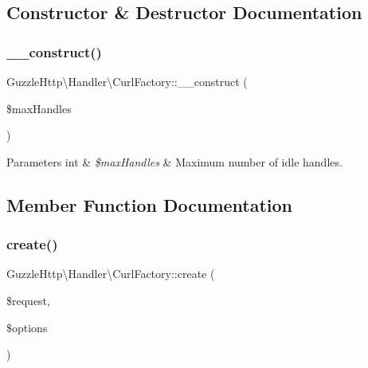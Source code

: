 \subsection{Constructor \& Destructor Documentation}
\mbox{\label{classGuzzleHttp_1_1Handler_1_1CurlFactory_aba5541f33e74d0ee53cf7b8e9ba402f3}} 
\subsubsection{\texorpdfstring{\+\_\+\+\_\+construct()}{\_\_construct()}}
{\footnotesize\ttfamily Guzzle\+Http\textbackslash{}\+Handler\textbackslash{}\+Curl\+Factory\+::\+\_\+\+\_\+construct (\begin{DoxyParamCaption}\item[{}]{\$max\+Handles }\end{DoxyParamCaption})}


\begin{DoxyParams}[1]{Parameters}
int & {\em \$max\+Handles} & Maximum number of idle handles. \\
\hline
\end{DoxyParams}


\subsection{Member Function Documentation}
\mbox{\label{classGuzzleHttp_1_1Handler_1_1CurlFactory_af3ad5606ce3270d876bcc99bebbf0723}} 
\subsubsection{\texorpdfstring{create()}{create()}}
{\footnotesize\ttfamily Guzzle\+Http\textbackslash{}\+Handler\textbackslash{}\+Curl\+Factory\+::create (\begin{DoxyParamCaption}\item[{\hyperlink{interfacePsr_1_1Http_1_1Message_1_1RequestInterface}{Request\+Interface}}]{\$request,  }\item[{array}]{\$options }\end{DoxyParamCaption})}

